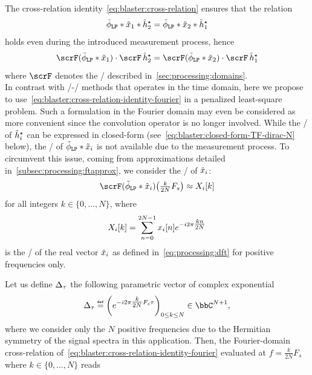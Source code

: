 The cross-relation identity~\cref{eq:blaster:cross-relation} ensures that the relation
\begin{equation}
    \idealLowPassFilter
    \ast \contRecordedSignal_1
    \ast  \contFilter_2^\star
    =
    \idealLowPassFilter
    \ast \contRecordedSignal_2
    \ast  \contFilter_1^\star
\end{equation}
holds even during the introduced measurement process, hence
\begin{equation}
    \label{eq:blaster:cross-relation-identity-fourier}
    \fourierTrans(\idealLowPassFilter\ast\contRecordedSignal_1) \cdot \fourierTrans \contFilter_2^\star
    =
    \fourierTrans(\idealLowPassFilter\ast\contRecordedSignal_2) \cdot \fourierTrans \contFilter_1^\star
\end{equation}
where $\fourierTrans$ denotes the \FTdef/ described in~\cref{sec:processing:domains}.
\\In contrast with \SIMO/-\BCE/ methods that operates in the time domain, here we propose to use~\cref{eq:blaster:cross-relation-identity-fourier} in a penalized least-square problem.
Such a formulation in the Fourier domain may even be considered as more convenient since the convolution operator is no longer involved.
While the \FT/ of $\tilde{h}_i^\star$ can be expressed in closed-form (see~\cref{eq:blaster:closed-form-TF-dirac-N} below), the \FT/ of $\idealLowPassFilter\ast\contRecordedSignal_i$ is not available due to the measurement process.
To circumvent this issue, coming from approximations detailed in~\cref{subsec:processing:ftapprox}, we consider the \DFTdef/ of $\tilde{x}_i$:
\begin{equation}
    \label{eq:blaster:approx-TF}
    \fourierTrans(\idealLowPassFilter\ast\contRecordedSignal_i)
    \kparen{\tfrac{k}{2N}F_s}
    \approx
    X_i[k]
\end{equation}
for all integers  $k \in \{0, \ldots, N\}$, where
\begin{equation}
    \label{eq:blaster:dft-Xi}
    X_i[k] = \sum_{n=0}^{2N-1}
    x_i[n]
    {e}^{-{i}2\pi \tfrac{kn}{2N}}
\end{equation}
is the \DFT/ of the real vector $\tilde{x}_i$ as defined in~\cref{eq:processing:dft} for positive frequencies only.

\mynewline
Let us define $\Delta_{\tau}$ the following parametric vector of complex exponential
\begin{equation}
    \label{eq:blaster:closed-form-TF-dirac-N}
    \paramVec{\tau} \eqdef
    \left(\cste^{-\csti2\pi\tfrac{k}{2N}F_s \tau}\right)_{0 \leq k \leq N}
    \in\bbC^{N+1}
    ,
\end{equation}
where we consider only the $N$ positive frequencies due to the Hermitian symmetry of the signal spectra in this application.
Then, the Fourier-domain cross-relation of~\cref{eq:blaster:cross-relation-identity-fourier} evaluated at $f = \frac{k}{2N}F_s$ where $k \in \{0,\ldots, N\}$
reads

